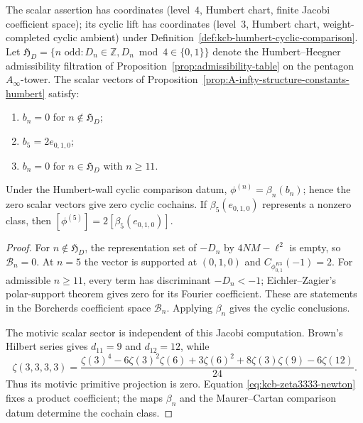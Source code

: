 \begin{theorem}
\label{thm:filtration-sharpness}
The scalar assertion has coordinates
(level~$4$, Humbert chart, finite Jacobi coefficient space); its cyclic
lift has coordinates (level~$3$, Humbert chart, weight-completed cyclic
ambient) under Definition~\ref{def:kcb-humbert-cyclic-comparison}.
Let $\mathfrak{H}_D = \{n\text{ odd}:D_n\in\mathbb Z,
D_n \bmod 4 \in \{0, 1\}\}$ denote the
Humbert--Heegner admissibility filtration of
Proposition~\ref{prop:admissibility-table} on the pentagon
$A_\infty$-tower.  The scalar vectors of
Proposition~\ref{prop:A-infty-structure-constants-humbert} satisfy:
\begin{enumerate}
\item $b_n=0$ for $n\notin\mathfrak H_D$;
\item $b_5=2e_{0,1,0}$;
\item $b_n=0$ for $n\in\mathfrak H_D$ with $n\geq11$.
\end{enumerate}
Under the Humbert-wall cyclic comparison datum,
$\phi^{(n)}=\beta_n(b_n)$; hence the zero scalar vectors give zero
cyclic cochains.  If $\beta_5(e_{0,1,0})$ represents a nonzero class,
then $[\phi^{(5)}]=2[\beta_5(e_{0,1,0})]$.
\end{theorem}

\begin{proof}
For $n\notin\mathfrak H_D$, the representation set of $-D_n$ by
$4NM-\ell^2$ is empty, so $\mathcal B_n=0$.  At $n=5$ the vector is
supported at $(0,1,0)$ and
$C_{\phi^{K3}_{0,1}}(-1)=2$.  For admissible $n\geq11$, every term has
discriminant $-D_n<-1$; Eichler--Zagier's polar-support theorem gives
zero for its Fourier coefficient.  These are statements in the
Borcherds coefficient space $\mathcal B_n$.  Applying $\beta_n$ gives
the cyclic conclusions.

The motivic scalar sector is independent of this Jacobi computation.
Brown's Hilbert series gives $d_{11}=9$ and $d_{12}=12$, while
\begin{equation}\label{eq:kcb-zeta3333-newton}
 \zeta(3,3,3,3)
 =\frac{\zeta(3)^4-6\zeta(3)^2\zeta(6)+3\zeta(6)^2
 +8\zeta(3)\zeta(9)-6\zeta(12)}{24}.
\end{equation}
Thus its motivic primitive projection is zero.  Equation
\eqref{eq:kcb-zeta3333-newton} fixes a product coefficient; the maps
$\beta_n$ and the Maurer--Cartan comparison datum determine the
cochain class.
\end{proof}

